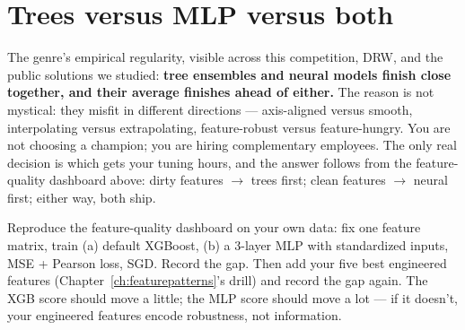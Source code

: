 \section{Trees versus MLP versus both}

The genre's empirical regularity, visible across this competition, DRW,
and the public solutions we studied: \textbf{tree ensembles and neural
models finish close together, and their average finishes ahead of either.}
The reason is not mystical: they misfit in different directions ---
axis-aligned versus smooth, interpolating versus extrapolating,
feature-robust versus feature-hungry. You are not choosing a champion; you
are hiring complementary employees. The only real decision is which gets
your tuning hours, and the answer follows from the feature-quality
dashboard above: dirty features $\to$ trees first; clean features $\to$
neural first; either way, both ship.

\begin{drillbox}
Reproduce the feature-quality dashboard on your own data: fix one feature
matrix, train (a) default XGBoost, (b) a 3-layer MLP with standardized
inputs, MSE + Pearson loss, SGD. Record the gap. Then add your five best
engineered features (Chapter~\ref{ch:featurepatterns}'s drill) and record
the gap again. The XGB score should move a little; the MLP score should
move a lot --- if it doesn't, your engineered features encode robustness,
not information.
\end{drillbox}
